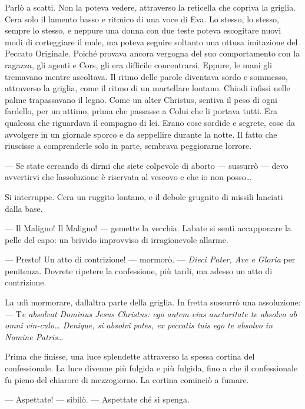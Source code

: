 Parlò a scatti. Non la poteva vedere, attraverso la reticella che
copriva la griglia. C\textquotesingle era solo il lamento basso e
ritmico di una voce di Eva. Lo stesso, lo stesso, sempre lo stesso, e
neppure una donna con due teste poteva escogitare nuovi modi di
corteggiare il male, ma poteva seguire soltanto una ottusa imitazione
del Peccato Originale. Poiché provava ancora vergogna del suo
comportamento con la ragazza, gli agenti e Cors, gli era difficile
concentrarsi. Eppure, le mani gli tremavano mentre ascoltava. Il ritmo
delle parole diventava sordo e sommesso, attraverso la griglia, come il
ritmo di un martellare lontano. Chiodi infissi nelle palme trapassavano
il legno. Come un alter Christus, sentiva il peso di ogni fardello, per
un attimo, prima che passasse a Colui che li portava tutti. Era qualcosa
che riguardava il compagno di lei. Erano cose sordide e segrete, cose da
avvolgere in un giornale sporco e da seppellire durante la notte. Il
fatto che riuscisse a comprenderle solo in parte, sembrava peggiorarne
l\textquotesingle orrore.

--- Se state cercando di dirmi che siete colpevole di aborto ---
sussurrò --- devo avvertirvi che l\textquotesingle assoluzione è
riservata al vescovo e che io non posso\ldots{}

Si interruppe. C\textquotesingle era un ruggito lontano, e il debole
grugnito di missili lanciati dalla base.

--- Il Maligno! Il Maligno! --- gemette la vecchia.
L\textquotesingle abate si sentì accapponare la pelle del capo: un
brivido improvviso di irragionevole allarme.

--- Presto! Un atto di contrizione! --- mormorò. --- \emph{Dieci Pater,
	Ave e Gloria} per penitenza. Dovrete ripetere la confessione, più tardi,
ma adesso un atto di contrizione.

La udì mormorare, dall\textquotesingle altra parte della griglia. In
fretta sussurrò una assoluzione: --- T\emph{e absolvat Dominus Jesus
	Christus: ego autem eius auctoritate te absolvo ab omni vin-culo\ldots{}
	Denique, si absolvi potes, ex peccatis tuis ego te absolvo in Nomine
	Patris\ldots{}}

Prima che finisse, una luce splendette attraverso la spessa cortina del
confessionale. La luce divenne più fulgida e più fulgida, fino a che il
confessionale fu pieno del chiarore di mezzogiorno. La cortina cominciò
a fumare.

--- Aspettate! --- sibilò. --- Aspettate ché si spenga.

